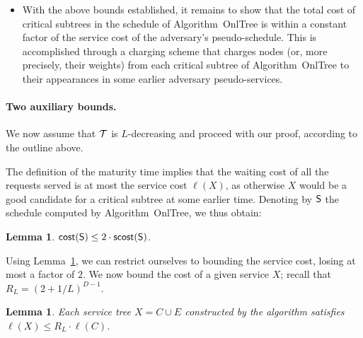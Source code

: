 \documentclass[a4paper]{article}
\newtheorem{lemma}[theorem]{Lemma}
\newcommand{\calT}{{\cal T}}
\newcommand{\cost}{\mbox{\rm\textsf{cost}}}
\newcommand{\scost}{\mbox{\rm\textsf{scost}}}
\newcommand{\length}{\ell}
\newcommand{\OnAlgTreesGeneral}{{\sc OnlTree}}
\newcommand{\schedS}{\mbox{\rm\textsf{S}}}
\begin{document}
\begin{itemize}
\begin{itemize}
		\item With the above bounds established, it remains to
			show that the total cost of critical subtrees in the
			schedule of Algorithm~{\OnAlgTreesGeneral}
			is within a constant factor of the service cost of the
			adversary's	pseudo-schedule. This is accomplished through a 
			charging scheme that charges nodes (or, more precisely,
			their weights) from each critical subtree of
			Algorithm~{\OnAlgTreesGeneral} to their appearances
			in some earlier adversary pseudo-services.
		
	\end{itemize}
	
\end{itemize}


\paragraph{Two auxiliary bounds.}
We now assume that $\calT$ is $L$-decreasing and proceed with our
proof, according to the outline above.

The definition of the
maturity time implies that the waiting cost of all the requests
served is at most the service cost $\length(X)$, as otherwise
$X$ would be a good candidate for a critical subtree at some
earlier time. Denoting by $\schedS$ the schedule computed by
Algorithm~{\OnAlgTreesGeneral}, we thus obtain:


\begin{lemma}\label{lem: mlap, cost <= 2*service}
$\cost(\schedS) \le 2\cdot\scost(\schedS)$.
\end{lemma}

Using Lemma~\ref{lem: mlap, cost <= 2*service},
 we can restrict ourselves to bounding the service
cost, losing at most a factor of $2$.  We now bound the cost of 
a given service $X$; recall that $R_L = (2+1/L)^{D-1}$.


\begin{lemma}\label{l:complete}
Each service tree $X=C\cup E$ constructed by the algorithm satisfies
$\length(X)\leq R_L\cdot\length(C)$.
\end{lemma}
\end{document}
